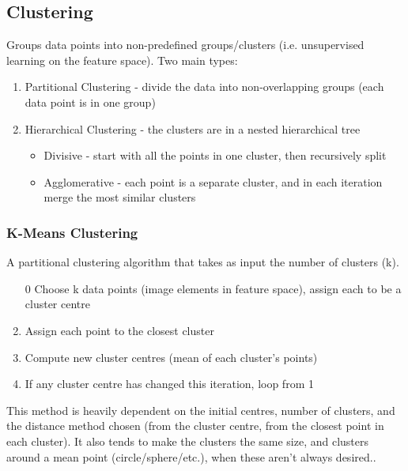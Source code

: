 \subsection{Clustering}
Groups data points into non-predefined groups/clusters (i.e. unsupervised learning on the feature space). Two main types:
\begin{enumerate}
    \item Partitional Clustering - divide the data into non-overlapping groups (each data point is in one group)
    \item Hierarchical Clustering - the clusters are in a nested hierarchical tree 
    \begin{itemize}
        \item Divisive - start with all the points in one cluster, then recursively split
        \item Agglomerative - each point is a separate cluster, and in each iteration merge the most similar clusters
    \end{itemize}
\end{enumerate}

\subsubsection{K-Means Clustering}
A partitional clustering algorithm that takes as input the number of clusters (k). 
\begin{enumerate}
    \item [0] Choose k data points (image elements in feature space), assign each to be a cluster centre
    \item Assign each point to the closest cluster 
    \item Compute new cluster centres (mean of each cluster's points)
    \item If any cluster centre has changed this iteration, loop from 1
\end{enumerate}
This method is heavily dependent on the initial centres, number of clusters, and the distance method chosen (from the cluster centre, from the closest point in each cluster). It also tends to make the clusters the same size, and clusters around a mean point (circle/sphere/etc.), when these aren't always desired..

